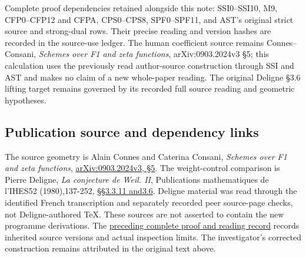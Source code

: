 Complete proof dependencies retained alongside this note: SSI0--SSI10,
M9, CFP0--CFP12 and CFPA, CPS0--CPS8, SPF0--SPF11, and AST's original
strict source and strong-dual rows. Their precise reading and version
hashes are recorded in the source-use ledger. The human coefficient
source remains Connes--Consani, \emph{Schemes over F1 and zeta
functions}, arXiv:0903.2024v3 §5; this calculation uses the previously
read author-source construction through SSI and AST and makes no claim
of a new whole-paper reading. The original Deligne §3.6 lifting target
remains governed by its recorded full source reading and geometric
hypotheses.

\subsection{Publication source and dependency
links}\label{publication-source-and-dependency-links}

The source geometry is Alain Connes and Caterina Consani, \emph{Schemes
over F1 and zeta functions},
\href{https://arxiv.org/abs/0903.2024v3}{arXiv:0903.2024v3, §5}. The
weight-control comparison is Pierre Deligne, \emph{La conjecture de
Weil. II}, Publications mathematiques de l'IHES52 (1980),137-252,
\href{https://www.numdam.org/item/PMIHES_1980__52__137_0/}{§§3.3.11
and3.6}. Deligne material was read through the identified French
transcription and separately recorded peer source-page checks, not
Deligne-authored TeX. These sources are not asserted to contain the new
programme derivations. The
\href{https://github.com/KokunoYumeto/zeta-function-research-reader/blob/36a82ecca98addb8a98b48204e349737856c7223/workbenches/splitzero-tandem/continuations/20260924-cohomology-weight-and-character-lifts/BUILD_AND_REVIEW.md}{preceding
complete proof and reading record} records inherited source versions and
actual inspection limits. The investigator's corrected construction
remains attributed in the original text above.
